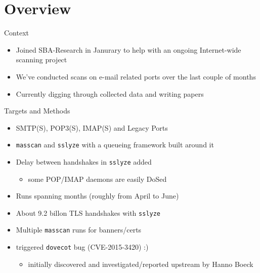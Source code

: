 \section{Overview}\label{overview}

\begin{frame}{Context}

\begin{itemize}
\itemsep1pt\parskip0pt
\item
  Joined SBA-Research in Janurary to help with an ongoing Internet-wide
  scanning project
\item
  We've conducted scans on e-mail related ports over the last couple of
  months
\item
  Currently digging through collected data and writing papers
\end{itemize}

\end{frame}

\begin{frame}{Targets and Methods}

\begin{itemize}
\itemsep1pt\parskip0pt
\item
  SMTP(S), POP3(S), IMAP(S) and Legacy Ports
\item
  \texttt{masscan} and \texttt{sslyze} with a queueing framework built
  around it
\item
  Delay between handshakes in \texttt{sslyze} added

  \begin{itemize}
  \itemsep1pt\parskip0pt
  \item
    some POP/IMAP daemons are easily DoSed
  \end{itemize}
\item
  Runs spanning months (roughly from April to June)
\item
  About 9.2 billon TLS handshakes with \texttt{sslyze}
\item
  Multiple \texttt{masscan} runs for banners/certs
\item
  triggered \texttt{dovecot} bug (CVE-2015-3420) :)

  \begin{itemize}
  \itemsep1pt\parskip0pt
  \item
    initially discovered and investigated/reported upstream by Hanno
    Boeck
  \end{itemize}
\end{itemize}

\end{frame}

